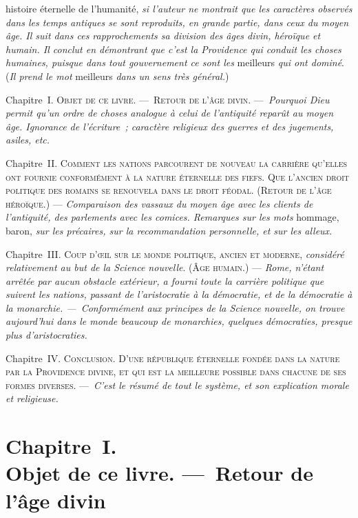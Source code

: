 \documentclass[french,twoside]{book} %
\newcommand\chapteropen{} %
\newcommand\chaptercont{} %
\newcommand\chapterclose{} %
\begin{document}
\chaptercont
{}histoire éternelle de l’humanité, {\itshape si l’auteur ne montrait que les caractères observés dans les temps antiques se sont reproduits, en grande partie, dans ceux du moyen âge. Il suit dans ces rapprochements sa division des âges divin, héroïque et humain. Il conclut en démontrant que c’est la Providence qui conduit les choses humaines, puisque dans tout gouvernement ce sont les} meilleurs {\itshape qui ont dominé}. ({\itshape Il prend le mot} meilleurs {\itshape dans un sens très général.})\par
Chapitre {\scshape I. Objet de ce livre. — Retour de l’âge divin.} — {\itshape Pourquoi Dieu permit qu’un ordre de choses analogue à celui de l’antiquité reparût au moyen âge. Ignorance de l’écriture ; caractère religieux des guerres et des jugements, asiles, etc.}\par
Chapitre {\scshape II. Comment les nations parcourent de nouveau la carrière qu’elles ont fournie conformément à la nature éternelle des fiefs. Que l’ancien droit politique des romains se renouvela dans le droit féodal. (Retour de l’âge héroïque.}) —  {\itshape Comparaison des vassaux du moyen âge avec les clients de l’antiquité, des parlements avec les comices. Remarques sur les mots} hommage, baron, {\itshape sur les précaires, sur la recommandation personnelle, et sur les alleux}.\par
Chapitre {\scshape III. Coup d’œil sur le monde politique, ancien et moderne}, {\itshape considéré relativement au but de la Science nouvelle}. (Â{\scshape ge humain}.) — {\itshape Rome, n’étant arrêtée par aucun obstacle extérieur, a fourni toute la carrière politique que suivent les nations, passant de l’aristocratie à la démocratie, et de la démocratie à la monarchie. — Conformément aux principes de la Science nouvelle, on trouve aujourd’hui dans le monde beaucoup de monarchies, quelques démocraties, presque plus d’aristocraties.}\par
Chapitre {\scshape IV. Conclusion. D’une république éternelle fondée dans la nature par la Providence divine, et qui est la meilleure possible dans chacune de ses formes diverses.} — {\itshape C’est le résumé de tout le système, et son explication morale et religieuse.}
\chapterclose


\chapteropen
\chapter[{Chapitre I. Objet de ce livre. — Retour de l’âge divin}]{Chapitre I. \\
Objet de ce livre. — Retour de l’âge divin}
\end{document}
